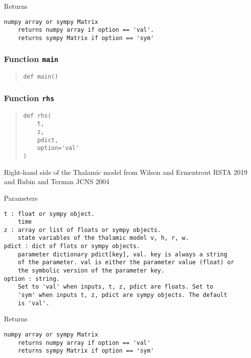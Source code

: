 \documentclass[
  english,
  a4paper,
  oneside]{article}
\begin{document}
Returns

\begin{verbatim}
numpy array or sympy Matrix
    returns numpy array if option == 'val'. 
    returns sympy Matrix if option == 'sym'
\end{verbatim}

\hypertarget{Thalamic.main}{%
\subsubsection{\texorpdfstring{Function
\texttt{main}}{Function main}}\label{Thalamic.main}}

\begin{quote}
\begin{verbatim}
def main()
\end{verbatim}
\end{quote}

\hypertarget{Thalamic.rhs}{%
\subsubsection{\texorpdfstring{Function
\texttt{rhs}}{Function rhs}}\label{Thalamic.rhs}}

\begin{quote}
\begin{verbatim}
def rhs(
    t,
    z,
    pdict,
    option='val'
)
\end{verbatim}
\end{quote}

Right-hand side of the Thalamic model from Wilson and Ermentrout RSTA
2019 and Rubin and Terman JCNS 2004

Parameters

\begin{verbatim}
t : float or sympy object.
    time
z : array or list of floats or sympy objects.
    state variables of the thalamic model v, h, r, w.
pdict : dict of flots or sympy objects.
    parameter dictionary pdict[key], val. key is always a string
    of the parameter. val is either the parameter value (float) or 
    the symbolic version of the parameter key.
option : string.
    Set to 'val' when inputs, t, z, pdict are floats. Set to
    'sym' when inputs t, z, pdict are sympy objects. The default
    is 'val'.
\end{verbatim}

Returns

\begin{verbatim}
numpy array or sympy Matrix
    returns numpy array if option == 'val'
    returns sympy Matrix if option == 'sym'
\end{verbatim}
\end{document}

